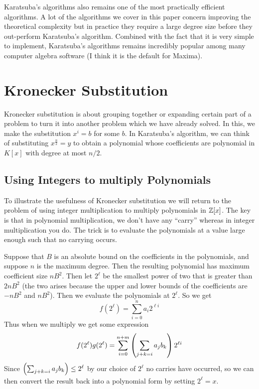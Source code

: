 Karatsuba's algorithms also remains one of the most practically efficient algorithms. A lot of the algorithms we cover in this paper concern improving the theoretical complexity but in practice they require a large degree size before they out-perform Karatsuba's algorithm. Combined with the fact that it is very simple to implement, Karatsuba's algorithms remains incredibly popular among many computer algebra software (I think it is the default for Maxima).


\section{Kronecker Substitution}%
\label{sub:kronecker_substitution}

Kronecker substitution is about grouping together or expanding certain part of a problem to turn it into another problem which we have already solved. In this, we make the substitution $x^i = b$ for some $b$. In Karatsuba's algorithm, we can think of substituting $x^{\frac{n}{2}} = y$ to obtain a polynomial whose coefficients are polynomial in $K[x]$ with degree at most $n/2$.

\subsection{Using Integers to multiply Polynomials}%
\label{sub:Using Integers to multiply Polynomials}

To illustrate the usefulness of Kronecker substitution we will return to the problem of using integer multiplication to multiply polynomials in ${\mathbb Z}[x]$. The key is that in polynomial multiplication, we don't have any ``carry'' whereas in integer multiplication you do. The trick is to evaluate the polynomials at a value large enough such that no carrying occurs.

Suppose that $B$ is an absolute bound on the coefficients in the polynomials, and suppose $n$ is the maximum degree. Then the resulting polynomial has maximum coefficient size $nB^2$. Then let $2^\ell$ be the smallest power of two that is greater than $2nB^2$ (the two arises because the upper and lower bounds of the coefficients are $-nB^2$ and $nB^2$). Then we evaluate the polynomials at $2^\ell$. So we get
\[
    f(2^\ell) = \sum^n_{i = 0} a_i 2^{\ell i}
\]
Thus when we multiply we get some expression
\[
    f(2^\ell)g(2^\ell) = \sum^{n+m}_{i=0} \left(\sum_{j + k = i} a_jb_k\right)2^{\ell i}
\]
Since $\left(\sum_{j + k = i}a_j b_k\right) \leq 2^{\ell}$ by our choice of $2^\ell$ no carries have occurred, so we can then convert the result back into a polynomial form by setting $2^\ell = x$.

